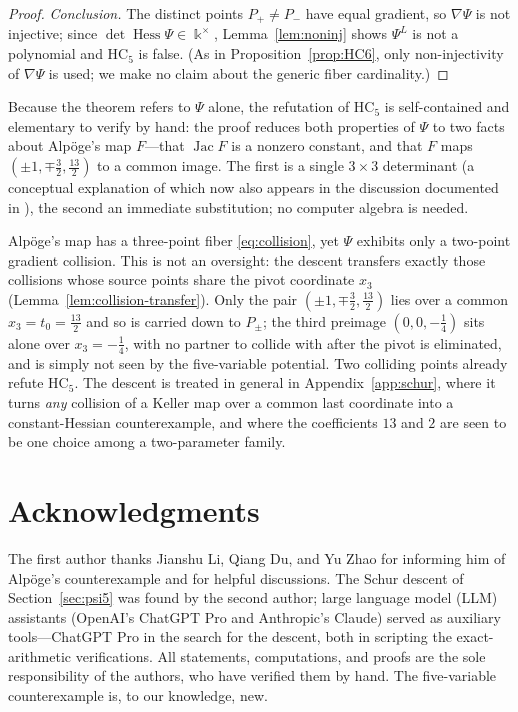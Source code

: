 \documentclass[11pt]{article}
\theoremstyle{plain}
\theoremstyle{definition}
\newcommand{\kk}{\Bbbk}
\newcommand{\HC}{\mathrm{HC}}
\newcommand{\Hess}{\operatorname{Hess}}
\newcommand{\Jac}{\operatorname{Jac}}
\begin{document}
\begin{proof}
\emph{Conclusion.} The distinct points
$P_+\ne P_-$ have equal gradient, so
$\nabla\Psi$ is not injective; since
$\det\Hess\Psi\in\kk^{\times}$, Lemma~\ref{lem:noninj} shows
$\Psi^{L}$ is not a polynomial and $\HC_5$ is false. (As in
Proposition~\ref{prop:HC6}, only non-injectivity of
$\nabla\Psi$ is used; we make no claim about the generic fiber
cardinality.)
\end{proof}

Because the theorem refers to $\Psi$ alone, the refutation of
$\HC_5$ is self-contained and elementary to verify by hand: the proof
reduces both properties of $\Psi$ to two facts about Alp\"oge's
map $F$---that $\Jac F$ is a nonzero constant, and that $F$ maps
$(\pm1,\mp\tfrac32,\tfrac{13}2)$ to a common image. The first is a single
$3\times3$ determinant (a conceptual explanation of which now also appears
in the discussion documented in \cite{Alpoge2026}), the second an
immediate substitution; no computer algebra is needed.

Alp\"oge's map has a three-point fiber \eqref{eq:collision}, yet
$\Psi$ exhibits only a two-point gradient collision. This is not
an oversight: the descent transfers exactly those collisions whose source
points share the pivot coordinate $x_3$
(Lemma~\ref{lem:collision-transfer}). Only the pair
$(\pm1,\mp\tfrac32,\tfrac{13}2)$ lies over a common $x_3=t_0=\tfrac{13}2$
and so is carried down to $P_\pm$; the third preimage
$(0,0,-\tfrac14)$ sits alone over $x_3=-\tfrac14$, with no partner to
collide with after the pivot is eliminated, and is simply not seen by the
five-variable potential. Two colliding points already refute $\HC_5$. The descent is treated in
general in Appendix~\ref{app:schur}, where it turns \emph{any} collision
of a Keller map over a common last coordinate into a constant-Hessian
counterexample, and where the coefficients $13$ and $2$ are seen to be
one choice among a two-parameter family.

\section*{Acknowledgments}
\noindent
The first author thanks Jianshu Li, Qiang Du, and Yu Zhao for informing
him of Alp\"oge's counterexample and for helpful discussions. The Schur
descent of Section~\ref{sec:psi5} was found by the second author; large
language model (LLM) assistants (OpenAI's ChatGPT Pro and Anthropic's
Claude) served as auxiliary tools---ChatGPT Pro in the search for the
descent, both in scripting the exact-arithmetic verifications. All
statements, computations, and proofs are the sole responsibility of the
authors, who have verified them by hand. The five-variable
counterexample is, to our knowledge, new.
\end{document}
